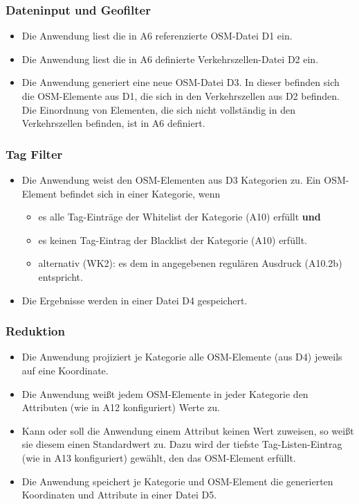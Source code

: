 \documentclass[parskip=full]{scrartcl} %
\begin{document}
\subsubsection*{Dateninput und Geofilter}
\begin{itemize}
    \item Die Anwendung liest die in A6 referenzierte OSM-Datei D1 ein.
    \item Die Anwendung liest die in A6 definierte Verkehrszellen-Datei D2 ein.
    \item Die Anwendung generiert eine neue OSM-Datei D3. In dieser befinden sich die OSM-Elemente aus D1, die sich in den Verkehrszellen aus D2 befinden. Die Einordnung von Elementen, die sich nicht vollständig in den Verkehrszellen befinden, ist in A6 definiert.
\end{itemize}


\subsubsection*{Tag Filter}
\begin{itemize}
    \item Die Anwendung weist den OSM-Elementen aus D3 Kategorien zu. Ein OSM-Element befindet sich in einer Kategorie, wenn
    \begin{itemize}
        \item es alle Tag-Einträge der Whitelist der Kategorie (A10) erfüllt \textbf{und}
        \item es keinen Tag-Eintrag der Blacklist der Kategorie (A10) erfüllt.
        \item alternativ (WK2): es dem in angegebenen regulären Ausdruck (A10.2b) entspricht.
    \end{itemize}
    \item Die Ergebnisse werden in einer Datei D4 gespeichert.
\end{itemize}


\subsubsection*{Reduktion}
\begin{itemize}
    \item Die Anwendung projiziert je Kategorie alle OSM-Elemente (aus D4) jeweils auf eine Koordinate.
    \item Die Anwendung weißt jedem OSM-Elemente in jeder Kategorie den Attributen (wie in A12 konfiguriert) Werte zu.
    \item Kann oder soll die Anwendung einem Attribut keinen Wert zuweisen, so weißt sie diesem einen Standardwert zu. Dazu wird der tiefste Tag-Listen-Eintrag (wie in A13 konfiguriert) gewählt, den das OSM-Element erfüllt.
    \item Die Anwendung speichert je Kategorie und OSM-Element die generierten Koordinaten und Attribute in einer Datei D5.
\end{itemize}
\end{document}
